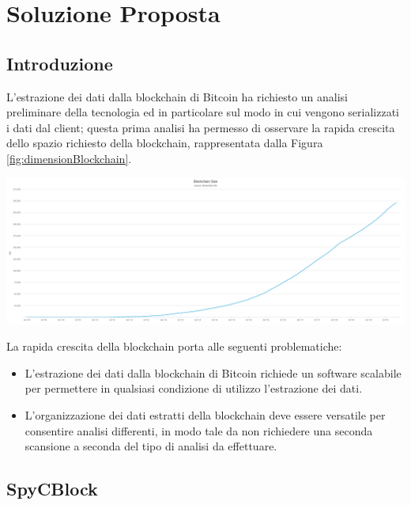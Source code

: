 \chapter{Soluzione Proposta}\label{chap:soluzioneproposta}

\section{Introduzione} \label{sec:solIntroduction}

L'estrazione dei dati dalla blockchain di Bitcoin ha richiesto un analisi preliminare della tecnologia ed in particolare sul modo in cui vengono serializzati i dati dal client; questa prima analisi ha permesso di osservare la rapida crescita dello spazio richiesto della blockchain, rappresentata dalla Figura \ref{fig:dimensionBlockchain}.

{\vspace{15pt}
\includegraphics[scale=0.18]{images/blockchain-size.png}
\vspace{10pt}
\par}

La rapida crescita della blockchain porta alle seguenti problematiche:

\begin{itemize}
  \item L'estrazione dei dati dalla blockchain di Bitcoin richiede un software scalabile per permettere in qualsiasi condizione di utilizzo l'estrazione dei dati.
  \item L'organizzazione dei dati estratti della blockchain deve essere versatile per consentire analisi differenti, in modo tale da non richiedere una seconda scansione a seconda del tipo di analisi da effettuare.
\end{itemize}

\section{SpyCBlock} \label{sec:spycblock}

